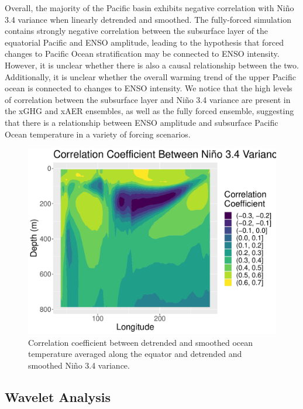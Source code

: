 \documentclass[11pt]{article}
\begin{document}
Overall, the majority of the Pacific basin exhibits negative correlation with Niño 3.4 variance when linearly detrended and smoothed. The fully-forced simulation contains strongly negative correlation between the subsurface layer of the equatorial Pacific and ENSO amplitude, leading to the hypothesis that forced changes to Pacific Ocean stratification may be connected to ENSO intensity. However, it is unclear whether there is also a causal relationship between the two. Additionally, it is unclear whether the overall warming trend of the upper Pacific ocean is connected to changes to ENSO intensity. We notice that the high levels of correlation between the subsurface layer and Niño 3.4 variance are present in the xGHG and xAER ensembles, as well as the fully forced ensemble, suggesting that there is a relationship between ENSO amplitude and subsurface Pacific Ocean temperature in a variety of forcing scenarios.

\begin{figure}
\centering
\includegraphics[width=.5\linewidth]{../../data/figures/tempdt.pdf}
\caption{\label{fig:tempdt}Correlation coefficient between detrended and smoothed ocean temperature averaged along the equator and detrended and smoothed Niño 3.4 variance.}
\end{figure}

\subsection{Wavelet Analysis}
\end{document}
